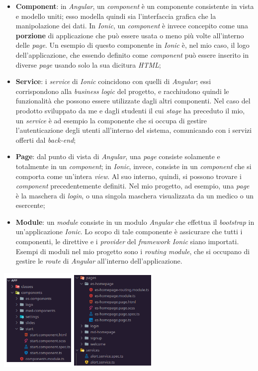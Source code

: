 \begin{itemize}
  \item \textbf{Component}: in \textit{Angular}, un \textit{component} è un componente consistente in vista e modello uniti; esso modella quindi sia l'interfaccia grafica che la manipolazione dei dati. In \textit{Ionic}, un \textit{component} è invece concepito come una \textbf{porzione} di applicazione che può essere usata o meno più volte all'interno delle \textit{page}. Un esempio di questo componente in \textit{Ionic} è, nel mio caso, il logo dell'applicazione, che essendo definito come \textit{component} può essere inserito in diverse \textit{page} usando solo la sua dicitura \textit{HTML};
  \item \textbf{Service}: i \textit{service} di \textit{Ionic} coincidono con quelli di \textit{Angular}; essi corrispondono alla \textit{business logic} del progetto, e racchiudono quindi le funzionalità che possono essere utilizzate dagli altri componenti. Nel caso del prodotto sviluppato da me e dagli studenti il cui \textit{stage} ha preceduto il mio, un \textit{service} è ad esempio la componente che si occupa di gestire l'autenticazione degli utenti all'interno del sistema, comunicando con i servizi offerti dal \textit{back-end};
  \item \textbf{Page}: dal punto di vista di \textit{Angular}, una \textit{page} consiste solamente e totalmente in un \textit{component}; in \textit{Ionic}, invece, consiste in un \textit{component} che si comporta come un'intera \textit{view}. Al suo interno, quindi, si possono trovare i \textit{component} precedentemente definiti. Nel mio progetto, ad esempio, una \textit{page} è la maschera di \textit{login}, o una singola maschera visualizzata da un medico o un esercente;
  \item \textbf{Module}: un \textit{module} consiste in un modulo \textit{Angular} che effettua il \textit{bootstrap} in un'applicazione \textit{Ionic}. Lo scopo di tale componente è assicurare che tutti i componenti, le direttive e i \textit{provider} del \textit{framework Ionic} siano importati. Esempi di moduli nel mio progetto sono i \textit{routing module}, che si occupano di gestire le \textit{route} di \textit{Angular} all'interno dell'applicazione.
\end{itemize}
\newpage

\begin{minipage}{\linewidth}
  \label{img:directory}
  \centering
    \includegraphics[height=5cm]{immagini/directory}
\end{minipage} \\

